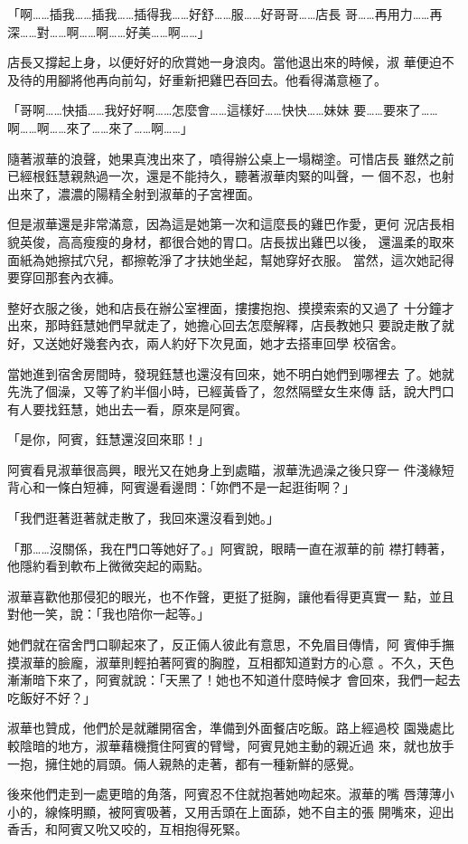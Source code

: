 「啊……插我……插我……插得我……好舒……服……好哥哥……店長
哥……再用力……再深……對……啊……啊……好美……啊……」

店長又撐起上身，以便好好的欣賞她一身浪肉。當他退出來的時候，淑
華便迫不及待的用腳將他再向前勾，好重新把雞巴吞回去。他看得滿意極了。

「哥啊……快插……我好好啊……怎麼會……這樣好……快快……妹妹
要……要來了……啊……啊……來了……來了……啊……」

隨著淑華的浪聲，她果真洩出來了，噴得辦公桌上一塌糊塗。可惜店長
雖然之前已經根鈺慧親熱過一次，還是不能持久，聽著淑華肉緊的叫聲，一
個不忍，也射出來了，濃濃的陽精全射到淑華的子宮裡面。

但是淑華還是非常滿意，因為這是她第一次和這麼長的雞巴作愛，更何
況店長相貌英俊，高高瘦瘦的身材，都很合她的胃口。店長拔出雞巴以後，
還溫柔的取來面紙為她擦拭穴兒，都擦乾淨了才扶她坐起，幫她穿好衣服。
當然，這次她記得要穿回那套內衣褲。

整好衣服之後，她和店長在辦公室裡面，摟摟抱抱、摸摸索索的又過了
十分鐘才出來，那時鈺慧她們早就走了，她擔心回去怎麼解釋，店長教她只
要說走散了就好，又送她好幾套內衣，兩人約好下次見面，她才去搭車回學
校宿舍。

當她進到宿舍房間時，發現鈺慧也還沒有回來，她不明白她們到哪裡去
了。她就先洗了個澡，又等了約半個小時，已經黃昏了，忽然隔壁女生來傳
話，說大門口有人要找鈺慧，她出去一看，原來是阿賓。

「是你，阿賓，鈺慧還沒回來耶！」

阿賓看見淑華很高興，眼光又在她身上到處瞄，淑華洗過澡之後只穿一
件淺綠短背心和一條白短褲，阿賓邊看邊問：「妳們不是一起逛街啊？」

「我們逛著逛著就走散了，我回來還沒看到她。」

「那……沒關係，我在門口等她好了。」阿賓說，眼睛一直在淑華的前
襟打轉著，他隱約看到軟布上微微突起的兩點。

淑華喜歡他那侵犯的眼光，也不作聲，更挺了挺胸，讓他看得更真實一
點，並且對他一笑，說：「我也陪你一起等。」

她們就在宿舍門口聊起來了，反正倆人彼此有意思，不免眉目傳情，阿
賓伸手撫摸淑華的臉龐，淑華則輕拍著阿賓的胸膛，互相都知道對方的心意
。不久，天色漸漸暗下來了，阿賓就說：「天黑了！她也不知道什麼時候才
會回來，我們一起去吃飯好不好？」

淑華也贊成，他們於是就離開宿舍，準備到外面餐店吃飯。路上經過校
園幾處比較陰暗的地方，淑華藉機攬住阿賓的臂彎，阿賓見她主動的親近過
來，就也放手一抱，擁住她的肩頭。倆人親熱的走著，都有一種新鮮的感覺。

後來他們走到一處更暗的角落，阿賓忍不住就抱著她吻起來。淑華的嘴
唇薄薄小小的，線條明顯，被阿賓吸著，又用舌頭在上面舔，她不自主的張
開嘴來，迎出香舌，和阿賓又吮又咬的，互相抱得死緊。

